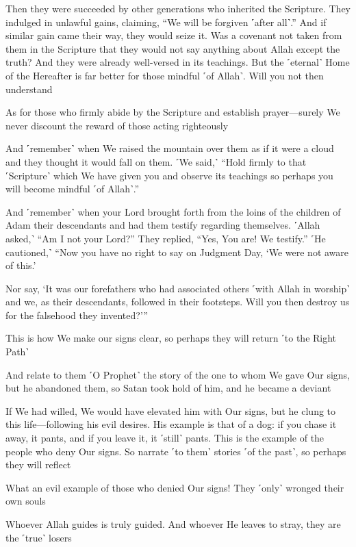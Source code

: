Then they were succeeded by other generations who inherited the Scripture. They indulged in unlawful gains, claiming, “We will be forgiven ˹after all˺.” And if similar gain came their way, they would seize it. Was a covenant not taken from them in the Scripture that they would not say anything about Allah except the truth? And they were already well-versed in its teachings. But the ˹eternal˺ Home of the Hereafter is far better for those mindful ˹of Allah˺. Will you not then understand

As for those who firmly abide by the Scripture and establish prayer—surely We never discount the reward of those acting righteously

And ˹remember˺ when We raised the mountain over them as if it were a cloud and they thought it would fall on them. ˹We said,˺ “Hold firmly to that ˹Scripture˺ which We have given you and observe its teachings so perhaps you will become mindful ˹of Allah˺.”

And ˹remember˺ when your Lord brought forth from the loins of the children of Adam their descendants and had them testify regarding themselves. ˹Allah asked,˺ “Am I not your Lord?” They replied, “Yes, You are! We testify.” ˹He cautioned,˺ “Now you have no right to say on Judgment Day, ‘We were not aware of this.’

Nor say, ‘It was our forefathers who had associated others ˹with Allah in worship˺ and we, as their descendants, followed in their footsteps. Will you then destroy us for the falsehood they invented?’”

This is how We make our signs clear, so perhaps they will return ˹to the Right Path˺

And relate to them ˹O Prophet˺ the story of the one to whom We gave Our signs, but he abandoned them, so Satan took hold of him, and he became a deviant

If We had willed, We would have elevated him with Our signs, but he clung to this life—following his evil desires. His example is that of a dog: if you chase it away, it pants, and if you leave it, it ˹still˺ pants. This is the example of the people who deny Our signs. So narrate ˹to them˺ stories ˹of the past˺, so perhaps they will reflect

What an evil example of those who denied Our signs! They ˹only˺ wronged their own souls

Whoever Allah guides is truly guided. And whoever He leaves to stray, they are the ˹true˺ losers

